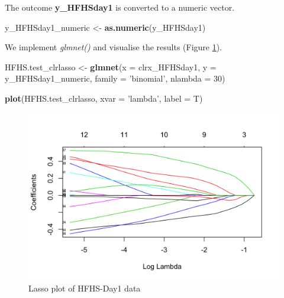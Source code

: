 \documentclass[openany]{book}
\newenvironment{Shaded}{\begin{snugshade}}{\end{snugshade}}
\newcommand{\KeywordTok}[1]{\textcolor[rgb]{0.13,0.29,0.53}{\textbf{#1}}}
\newcommand{\DataTypeTok}[1]{\textcolor[rgb]{0.13,0.29,0.53}{#1}}
\newcommand{\DecValTok}[1]{\textcolor[rgb]{0.00,0.00,0.81}{#1}}
\newcommand{\StringTok}[1]{\textcolor[rgb]{0.31,0.60,0.02}{#1}}
\newcommand{\NormalTok}[1]{#1}
\begin{document}
The outcome \textbf{y\_HFHSday1} is converted to a numeric vector.

\begin{Shaded}
\begin{Highlighting}[]
\NormalTok{y_HFHSday1_numeric <-}\StringTok{ }\KeywordTok{as.numeric}\NormalTok{(y_HFHSday1)}
\end{Highlighting}
\end{Shaded}

We implement \emph{glmnet()} and visualise the results (Figure
\ref{fig:HFHSlasso}).

\begin{Shaded}
\begin{Highlighting}[]
\NormalTok{HFHS.test_clrlasso <-}\StringTok{ }\KeywordTok{glmnet}\NormalTok{(}\DataTypeTok{x =}\NormalTok{ clrx_HFHSday1, }\DataTypeTok{y =}\NormalTok{ y_HFHSday1_numeric, }
                             \DataTypeTok{family =} \StringTok{'binomial'}\NormalTok{, }\DataTypeTok{nlambda =} \DecValTok{30}\NormalTok{)}
\end{Highlighting}
\end{Shaded}

\begin{Shaded}
\begin{Highlighting}[]
\KeywordTok{plot}\NormalTok{(HFHS.test_clrlasso, }\DataTypeTok{xvar =} \StringTok{'lambda'}\NormalTok{, }\DataTypeTok{label =}\NormalTok{ T)}
\end{Highlighting}
\end{Shaded}

\begin{figure}

{\centering \includegraphics[width=1\linewidth]{./Generated_plots/HFHSlasso-1} 

}

\caption{Lasso plot of HFHS-Day1 data}\label{fig:HFHSlasso}
\end{figure}
\end{document}
